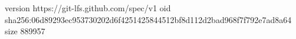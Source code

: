 version https://git-lfs.github.com/spec/v1
oid sha256:06d89293ec953730202d6f4251425844512bf8d112d2bad968f7f792e7ad8a64
size 889957
